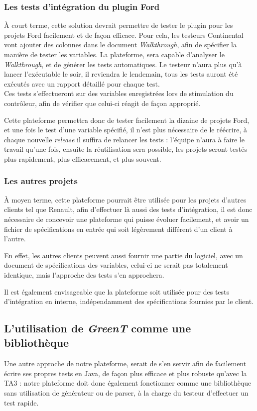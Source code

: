 	\subsubsection{Les tests d'intégration du plugin Ford}
	À court terme, cette solution devrait permettre de tester le plugin pour les projets Ford facilement et de façon efficace. Pour cela, les testeurs Continental vont ajouter des colonnes dans le document \textit{Walkthrough}, afin de spécifier la manière de tester les variables. La plateforme, sera capable d'analyser le \textit{Walkthrough}, et de générer les tests automatiques. Le testeur n'aura plus qu'à lancer l'exécutable le soir, il reviendra le lendemain, tous les tests auront été exécutés avec un rapport détaillé pour chaque test.\\

	Ces tests s'effectueront sur des variables enregistrées lors de stimulation du contrôleur, afin de vérifier que celui-ci réagit de façon approprié.

	Cette plateforme permettra donc de tester facilement la dizaine de projets Ford, et une fois le test d'une variable spécifié, il n'est plus nécessaire de le réécrire, à chaque nouvelle \textit{release} il suffira de relancer les tests : l'équipe n'aura à faire le travail qu'une fois, ensuite la réutilisation sera possible, les projets seront testés plus rapidement, plus efficacement, et plus souvent.

	\subsubsection{Les autres projets}
	À moyen terme, cette plateforme pourrait être utilisée pour les projets d'autres clients tel que Renault, afin d'effectuer là aussi des tests d'intégration, il est donc nécessaire de concevoir une plateforme qui puisse évoluer facilement, et avoir un fichier de spécifications en entrée qui soit légèrement différent d'un client à l'autre.

	En effet, les autres clients peuvent aussi fournir une partie du logiciel, avec un document de spécifications des variables, celui-ci ne serait pas totalement identique, mais l'approche des tests s'en approchera.

	Il est également envisageable que la plateforme soit utilisée pour des tests d'intégration en interne, indépendamment des spécifications fournies par le client.

	\subsection{L'utilisation de \textit{GreenT} comme une bibliothèque}
		Une autre approche de notre plateforme, serait de s'en servir afin de facilement écrire ses propres tests en Java, de façon plus efficace et plus robuste qu'avec la TA3 : notre plateforme doit donc également fonctionner comme une bibliothèque sans utilisation de générateur ou de parser, à la charge du testeur d'effectuer un test rapide. 

